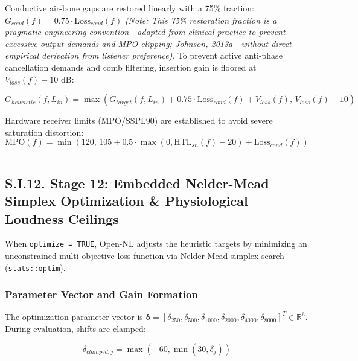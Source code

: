 \documentclass[
  12pt,
]{article}
\begin{document}
Conductive air-bone gaps are restored linearly with a 75\% fraction:
\(G_{cond}(f) = 0.75 \cdot \text{Loss}_{cond}(f)\) \emph{(Note: This
75\% restoration fraction is a pragmatic engineering
convention---adapted from clinical practice to prevent excessive output
demands and MPO clipping; Johnson, 2013a---without direct empirical
derivation from listener preference)}. To prevent active anti-phase
cancellation demands and comb filtering, insertion gain is floored at
\(V_{loss}(f) - 10\) dB:

\begin{equation}
G_{heuristic}(f, L_{in}) = \max\left(G_{target}(f, L_{in}) + 0.75 \cdot \text{Loss}_{cond}(f) + V_{loss}(f),\, V_{loss}(f) - 10\right)
\end{equation}

Hardware receiver limits (MPO/SSPL90) are established to avoid severe
saturation distortion: \begin{equation}
\text{MPO}(f) = \min\left(120,\, 105 + 0.5 \cdot \max(0, \text{HTL}_{sn}(f) - 20) + \text{Loss}_{cond}(f)\right)
\end{equation}

\begin{center}\rule{0.5\linewidth}{0.5pt}\end{center}

\subsection{S.I.12. Stage 12: Embedded Nelder-Mead Simplex Optimization
\& Physiological Loudness
Ceilings}\label{s.i.12.-stage-12-embedded-nelder-mead-simplex-optimization-physiological-loudness-ceilings}

When \texttt{optimize\ =\ TRUE}, Open-NL adjusts the heuristic targets
by minimizing an unconstrained multi-objective loss function via
Nelder-Mead simplex search (\texttt{stats::optim}).

\subsubsection{Parameter Vector and Gain
Formation}\label{parameter-vector-and-gain-formation}

The optimization parameter vector is
\(\boldsymbol{\delta} = [\delta_{250}, \delta_{500}, \delta_{1000}, \delta_{2000}, \delta_{4000}, \delta_{8000}]^T \in \mathbb{R}^6\).
During evaluation, shifts are clamped:

\begin{equation}
\delta_{clamped, j} = \max(-60, \min(30, \delta_j))
\end{equation}
\end{document}
